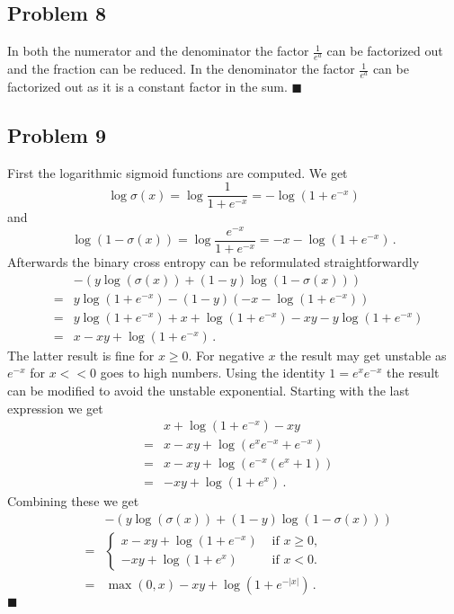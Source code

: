 \documentclass{scrartcl}
\newcommand{\qed}{\hfill $\blacksquare$}
\begin{document}
\subsection{Problem 8}
In both the numerator and the denominator the factor $\frac{1}{e^a}$ can be factorized out and the fraction can be reduced. In the denominator the factor $\frac{1}{e^a}$ can be factorized out as it is a constant factor in the sum. \qed

\subsection{Problem 9}
First the logarithmic sigmoid functions are computed.
We get
\begin{equation}
	\log \sigma (x) = \log \frac{1}{1+e^{-x}} = -\log (1+e^{-x})
\end{equation} 
and 
\begin{equation}
	\log (1- \sigma(x)) = \log \frac{e^{-x}}{1+e^{-x}} = -x -\log (1+e^{-x}) \, .
\end{equation}
Afterwards the binary cross entropy can be reformulated straightforwardly
\begin{eqnarray}
	&&-(y\log(\sigma(x)) + (1-y) \log (1- \sigma(x)))\\
	&=& y\log(1+ e^{-x}) - (1-y) (-x - \log (1+e^{-x}))\\
	&=& y\log(1+ e^{-x}) + x + \log(1+ e^{-x}) - xy -y\log(1+e^{-x})\\
	&=& x -xy + \log (1+e^{-x})\, .
\end{eqnarray}
The latter result is fine for $x\ge0$. For negative $x$ the result may get unstable as $e^{-x}$ for $x << 0$ goes to high numbers.
Using the identity $1 = e^x e^{-x}$ the result can be modified to avoid the unstable exponential.
Starting with the last expression we get
\begin{eqnarray}
	&&x + \log (1+e^{-x}) - xy\\
	&=& x - xy + \log (e^x e^{-x} + e^{-x})\\
	&=& x - xy + \log(e^{-x}(e^x + 1))\\
	&=& -xy + \log(1+e^x)\, .
\end{eqnarray}
Combining these we get
\begin{eqnarray}
&&-(y\log(\sigma(x)) + (1-y) \log (1- \sigma(x)))\\
&=& \begin{cases}
	x -xy + \log (1+e^{-x}) & \text{ if } x\ge 0,\\
	-xy + \log(1+e^x) & \text{ if } x<0.
\end{cases}\\
&=& \max(0,x) - xy + \log(1+e^{-|x|})\, .
\end{eqnarray}
\qed
\end{document}
